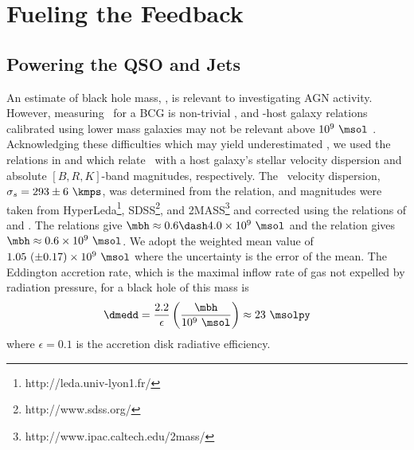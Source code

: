 \documentclass[useAMS,usenatbib]{mn2e}
\begin{document}
\section{Fueling the Feedback}
\label{sec:fuel}

\subsection{Powering the QSO and Jets}

An estimate of black hole mass, \mbh, is relevant to investigating AGN
activity. However, measuring \mbh\ for a BCG is non-trivial
\citep[\eg][]{2009ApJ...690..537D}, and \mbh-host galaxy relations
calibrated using lower mass galaxies may not be relevant above $10^9
~\msol$ \citep{2007ApJ...662..808L}. Acknowledging these difficulties
which may yield underestimated \mbh, we used the relations in
\citet{2002ApJ...574..740T} and \citet{2007MNRAS.379..711G} which
relate \mbh\ with a host galaxy's stellar velocity dispersion and
absolute $[B,R,K]$-band magnitudes, respectively. The \irs\ velocity
dispersion, $\sigma_s = 293 \pm 6 ~\kmps$, was determined from the
\citet{1976ApJ...204..668F} relation, and magnitudes were taken from
HyperLeda\footnote{http://leda.univ-lyon1.fr/},
SDSS\footnote{http://www.sdss.org/}, and
2MASS\footnote{http://www.ipac.caltech.edu/2mass/} and corrected using
the relations of \citet{cardelli89} and \citet{poggianti97}. The
\citet{2007MNRAS.379..711G} relations give $\mbh \approx 0.6 \dash 4.0
\times 10^9 ~\msol$ and the \citet{2002ApJ...574..740T} relation gives
$\mbh \approx 0.6 \times 10^9 ~\msol$. We adopt the weighted mean
value of $1.05 ~(\pm 0.17) \times 10^9 ~\msol$ where the uncertainty
is the error of the mean. The Eddington accretion rate, which is the
maximal inflow rate of gas not expelled by radiation pressure, for a
black hole of this mass is
\begin{equation}
  \dmedd = \frac{2.2}{\epsilon} \left(\frac{\mbh}{10^9~\msol}\right)
  \approx 23 ~\msolpy
\end{equation}
where $\epsilon = 0.1$ is the accretion disk radiative efficiency.
\end{document}
